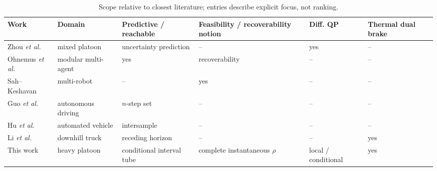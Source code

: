 \begin{table}[t]
\caption{Scope relative to closest literature; entries describe explicit focus, not ranking.}
\label{tab:positioning}
\centering\normalsize
\begin{tabular}{@{}>{\raggedright\arraybackslash}p{}>{\raggedright\arraybackslash}p{}>{\raggedright\arraybackslash}p{}>{\raggedright\arraybackslash}p{}>{\raggedright\arraybackslash}p{}>{\raggedright\arraybackslash}p{}@{}}
\toprule
Work & Domain & Predictive / reachable & Feasibility / recoverability notion & Diff. QP & Thermal dual brake \\
\midrule
Zhou \emph{et al.} \cite{zhou2026cooperative} & mixed platoon & uncertainty prediction & -- & yes & -- \\
Ohnemus \emph{et al.} \cite{ohnemus2026dpcbf} & modular multi-agent & yes & recoverability & -- & -- \\
Sah--Keshavan \cite{sah2026exact} & multi-robot & -- & yes & -- & -- \\
Guo \emph{et al.} \cite{guo2025uncertainty} & autonomous driving & $n$-step set & -- & -- & -- \\
Hu \emph{et al.} \cite{hu2025event} & automated vehicle & intersample & -- & -- & -- \\
Li \emph{et al.} \cite{li2025retarder} & downhill truck & receding horizon & -- & -- & yes \\
This work & heavy platoon & conditional interval tube & complete instantaneous $\rho$ & local / conditional & yes \\
\bottomrule
\end{tabular}
\end{table}
